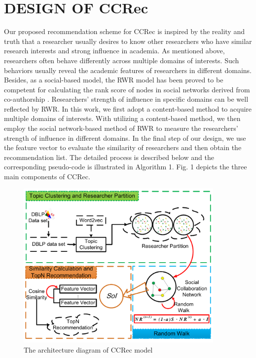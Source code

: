 \documentclass[review]{elsarticle}
\begin{document}
\section{DESIGN OF CCRec}
Our proposed recommendation scheme for CCRec is inspired by the reality and truth that a researcher usually desires to know other researchers who have similar research interests and strong influence in academia. As mentioned above, researchers often behave differently across multiple domains of interests. Such behaviors usually reveal the academic features of researchers in different domains. Besides, as a social-based model, the RWR model has been proved to be competent for calculating the rank score of nodes in social networks derived from co-authorship \cite{li2014acrec}. Researchers' strength of influence in specific domains can be well reflected by RWR. In this work, we first adopt a content-based method to acquire multiple domains of interests. With utilizing a content-based method, we then employ the social network-based method of RWR to measure the researchers' strength of influence in different domains. In the final step of our design, we use the feature vector to evaluate the similarity of researchers and then obtain the recommendation list. The detailed process is described below and the corresponding pseudo-code is illustrated in Algorithm 1. Fig. 1 depicts the three main components of CCRec.

\begin{figure}
\centering
\includegraphics [width=4in]{Fig1.pdf}
\caption{The architecture diagram of CCRec model}
\end{figure}
\end{document}
